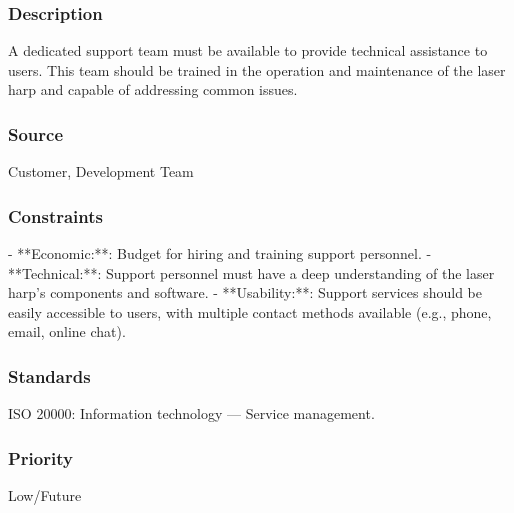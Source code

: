 \subsubsection{Description}
A dedicated support team must be available to provide technical assistance to users. This team should be trained in the operation and maintenance of the laser harp and capable of addressing common issues.
\subsubsection{Source}
Customer, Development Team
\subsubsection{Constraints}
- **Economic:**: Budget for hiring and training support personnel.
- **Technical:**: Support personnel must have a deep understanding of the laser harp's components and software.
- **Usability:**: Support services should be easily accessible to users, with multiple contact methods available (e.g., phone, email, online chat).
\subsubsection{Standards}
ISO 20000: Information technology — Service management.
\subsubsection{Priority}
Low/Future
